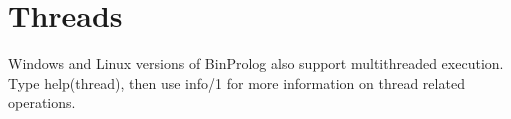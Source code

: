 \documentclass{article}
\begin{document}





 




\section{Threads}

Windows and Linux versions of BinProlog also support multithreaded execution.
Type help(thread), then use info/1 for more information on thread related operations.
\end{document}
